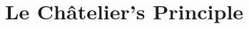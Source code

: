 \documentclass{book}
\begin{document}
 
 
\newcommand\chapterlabel{}\newcommand\ChapterNameLabel{}\newcommand\labname{}\newcommand\chapterpathtocontent{}\newcommand\chapterpathtoimages{}\newcommand\chapterpath{} 

\section{Le Ch\^atelier's Principle}
\renewcommand\chapterlabel{Ch-equilibrium}\renewcommand\ChapterNameLabel{\chapterlabel}\renewcommand\labname{lechatelier}\renewcommand\chapterpathtocontent{../../}\renewcommand\chapterpathtoimages{\chapterpathtocontent}\renewcommand\chapterpath{../../\chapterlabel/LAB-\labname/}

 
 
\end{document}
